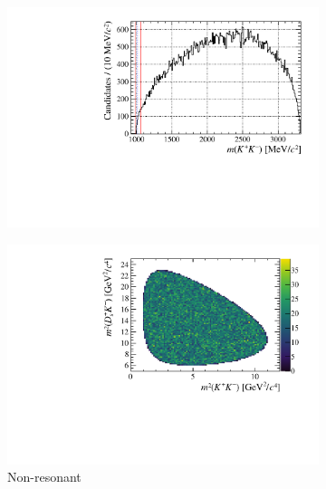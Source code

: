\begin{figure}[!ht]
    \begin{subfigure}[t]{0.32\textwidth}    
        \centering 
        \includegraphics[width=1.0\textwidth]{figs/B2DsPhi/NR_phi_mass.pdf}
    \end{subfigure}
    \begin{subfigure}[t]{0.32\textwidth}    
        \centering 
        \includegraphics[width=1.0\textwidth]{figs/B2DsPhi/NR_Dalitz_plot.pdf}
        \caption{Non-resonant}
    \end{subfigure}
    \begin{subfigure}[t]{0.32\textwidth}    
        \centering 

\end{subfigure}
\end{figure}

